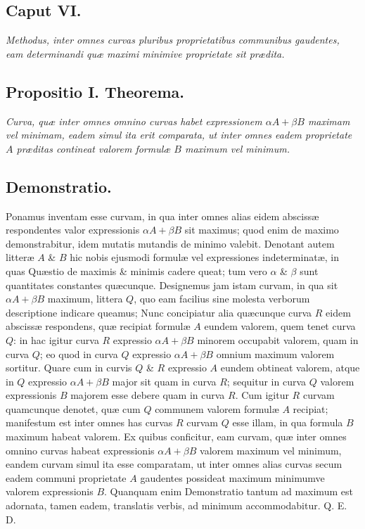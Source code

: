 \subsection*{Caput VI.}
\textit{Methodus, inter omnes curvas pluribus proprietatibus communibus gaudentes, eam determinandi quæ maximi minimive proprietate sit prædita.}
\subsection*{Propositio I. Theorema.}
\textit{Curva, quæ inter omnes omnino curvas habet expressionem $\alpha A+\beta B$ maximam vel minimam, eadem simul ita erit comparata, ut inter omnes eadem proprietate $A$ præditas contineat valorem formulæ $B$ maximum vel minimum.}
\subsection*{Demonstratio.}
Ponamus inventam esse curvam, in qua inter omnes alias eidem abscissæ respondentes valor expressionis $\alpha A+\beta B$ sit maximus; quod enim de maximo demonstrabitur, idem mutatis mutandis de minimo valebit. Denotant autem litteræ $A$ \& $B$ hic nobis ejusmodi formulæ vel expressiones indeterminatæ, in quas Quæstio de maximis \& minimis cadere queat; tum vero $\alpha$ \& $\beta$ sunt quantitates constantes quæcunque. Designemus jam istam curvam, in qua sit $\alpha A+\beta B$ maximum, littera $Q$, quo eam facilius sine molesta verborum descriptione indicare queamus; Nunc concipiatur alia quæcunque curva $R$ eidem abscissæ respondens, quæ recipiat formulæ $A$ eundem valorem, quem tenet curva $Q$: in hac igitur curva $R$ expressio $\alpha A+\beta B$ minorem occupabit valorem, quam in curva $Q$; eo quod in curva $Q$ expressio $\alpha A+\beta B$ omnium maximum valorem sortitur. Quare cum in curvis $Q$ \& $R$ expressio $A$ eundem obtineat valorem, atque in $Q$ expressio $\alpha A+\beta B$ major sit quam in curva $R$; sequitur in curva $Q$ valorem expressionis $B$ majorem esse debere quam in curva $R$. Cum igitur $R$ curvam quamcunque denotet, quæ cum $Q$ communem valorem formulæ $A$ recipiat; manifestum est inter omnes has curvas $R$ curvam $Q$ esse illam, in qua formula $B$ maximum habeat valorem. Ex quibus conficitur, eam curvam, quæ inter omnes omnino curvas habeat expressionis $\alpha A+\beta B$ valorem maximum vel minimum, eandem curvam simul ita esse comparatam, ut inter omnes alias curvas secum eadem communi proprietate $A$ gaudentes possideat maximum minimumve valorem expressionis $B$. Quanquam enim Demonstratio tantum ad maximum est adornata, tamen eadem, translatis verbis, ad minimum accommodabitur. Q. E. D.
